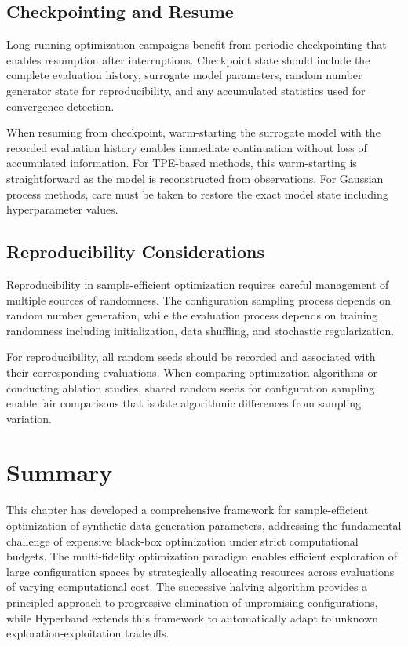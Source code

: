 \subsection{Checkpointing and Resume}

Long-running optimization campaigns benefit from periodic checkpointing that enables resumption after interruptions. Checkpoint state should include the complete evaluation history, surrogate model parameters, random number generator state for reproducibility, and any accumulated statistics used for convergence detection.

When resuming from checkpoint, warm-starting the surrogate model with the recorded evaluation history enables immediate continuation without loss of accumulated information. For TPE-based methods, this warm-starting is straightforward as the model is reconstructed from observations. For Gaussian process methods, care must be taken to restore the exact model state including hyperparameter values.

\subsection{Reproducibility Considerations}

Reproducibility in sample-efficient optimization requires careful management of multiple sources of randomness. The configuration sampling process depends on random number generation, while the evaluation process depends on training randomness including initialization, data shuffling, and stochastic regularization.

For reproducibility, all random seeds should be recorded and associated with their corresponding evaluations. When comparing optimization algorithms or conducting ablation studies, shared random seeds for configuration sampling enable fair comparisons that isolate algorithmic differences from sampling variation.

\section{Summary}
\label{sec:ch8_summary}

This chapter has developed a comprehensive framework for sample-efficient optimization of synthetic data generation parameters, addressing the fundamental challenge of expensive black-box optimization under strict computational budgets. The multi-fidelity optimization paradigm enables efficient exploration of large configuration spaces by strategically allocating resources across evaluations of varying computational cost. The successive halving algorithm provides a principled approach to progressive elimination of unpromising configurations, while Hyperband extends this framework to automatically adapt to unknown exploration-exploitation tradeoffs.

